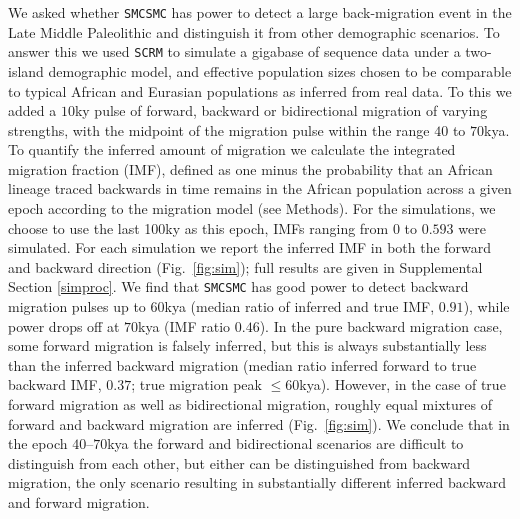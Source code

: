 \documentclass{article}
\begin{document}
We asked whether {\tt SMCSMC} has power to detect a large back-migration event in the Late Middle Paleolithic and distinguish it from other demographic scenarios. To answer this we used {\tt SCRM} \cite{Staab2015} to simulate a gigabase of sequence data under a two-island demographic model,
and effective population sizes chosen to be comparable to typical African and Eurasian populations as inferred from real data. 
To this we added a $10$ky pulse of forward, backward or bidirectional migration of varying strengths, with the midpoint of the migration pulse within the range $40$ to $70$kya.  To quantify the inferred amount of migration we calculate the integrated migration fraction (IMF), defined as one minus the probability that an African lineage traced backwards in time remains in the African population across a given epoch according to the migration model (see Methods).  For the simulations, we choose to use the last 100ky as this epoch, IMFs ranging from $0$ to $0.593$ were simulated.
For each simulation we report the inferred IMF in both the forward and backward direction (Fig.\ \ref{fig:sim}); full results are given in Supplemental Section \ref{simproc}.  We find that {\tt SMCSMC} has good power to detect backward migration pulses up to $60$kya (median ratio of inferred and true IMF, $0.91$), while power drops off at $70$kya (IMF ratio $0.46$). In the pure backward migration case, some forward migration is falsely inferred, but this is always substantially less than the inferred backward migration (median ratio inferred forward to true backward IMF, $0.37$; true migration peak $\leq 60$kya).  However, in the case of true forward migration as well as bidirectional migration, roughly equal mixtures of forward and backward migration are inferred (Fig.\ \ref{fig:sim}). We conclude that in the epoch $40$--$70$kya the forward and bidirectional scenarios are difficult to distinguish from each other, but either can be distinguished from backward migration, the only scenario resulting in substantially different inferred backward and forward migration.
\end{document}
